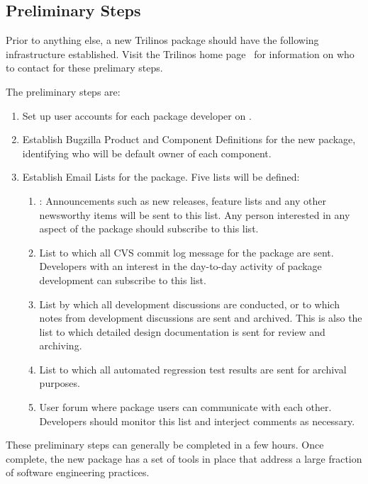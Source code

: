 \documentclass[12pt,relax]{TrilinosDevGuide}
\begin{document}
\subsection{Preliminary Steps}

Prior to anything else, a new Trilinos package should have the
following infrastructure established.  Visit the Trilinos home
page~\cite{Trilinos-home-page} for information on who to contact for
these prelimary steps.

The preliminary steps are:
\begin{enumerate}
\item Set up user accounts for each package developer 
on .
\item Establish Bugzilla Product and Component Definitions for the new
package, identifying who will be default owner of each component.
\item Establish Email Lists for the package.  Five lists will be
defined:
\begin{enumerate}
\item {}: 
Announcements such as 
new releases, feature lists and any other newsworthy items will be
sent to this list.  Any person interested in any aspect of the package
should subscribe to this list.
\item {} List
to which all CVS commit log message for the package are sent.
Developers with an interest in the day-to-day activity of package
development can subscribe to this list.
\item {}
List by which all development discussions are conducted, or to which
notes from development discussions are sent and archived.  This is
also the list to which detailed design documentation is sent for
review and archiving.
\item {} List
to which all automated regression test results are sent for archival purposes.
\item {} User
forum where package users can communicate with each other.  Developers
should monitor this list and interject comments as necessary.
\end{enumerate}
\end{enumerate}
These preliminary steps can generally be completed in a few hours.
Once complete, the new package has a set of tools in place that
address a large fraction of software engineering practices.
\end{document}
